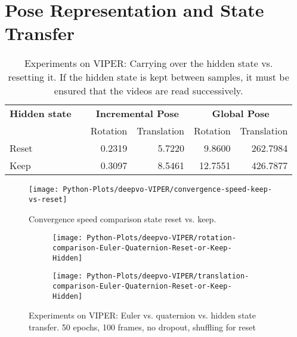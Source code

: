 	\section{Pose Representation and State Transfer}
		\begin{table}[tb]
			\small
			\begin{center}
				\begin{tabular}{lcrrrr}
					\toprule
					\textbf{Hidden state} & & \multicolumn{2}{c}{\textbf{Incremental Pose}} & \multicolumn{2}{c}{\textbf{Global Pose}} \\
					& & Rotation & Translation & Rotation & Translation \\
					\midrule
					Reset 		& 			& 0.2319	& 5.7220	& 9.8600	& 262.7984		\\ 
					Keep		&			& 0.3097	& 8.5461	& 12.7551	& 426.7877		\\
					\bottomrule
				\end{tabular}
			\end{center}
			\caption[Experiments on VIPER: Carrying over the hidden state vs. resetting it]
					{Experiments on VIPER: Carrying over the hidden state vs. resetting it.
					 If the hidden state is kept between samples, it must be ensured that the videos are read successively.
					 \label{tbl:kitti-removing-lstm}}
		\end{table}
	
		\begin{figure}[t]
			\centering
			\texttt{[image: Python-Plots/deepvo-VIPER/convergence-speed-keep-vs-reset]}
			\caption[]
					{Convergence speed comparison state reset vs. keep.}
		\end{figure}
		
		
		
		\begin{figure}
			\centering
			\begin{subfigure}[b]{0.5\linewidth}
				\centering
				\texttt{[image: Python-Plots/deepvo-VIPER/rotation-comparison-Euler-Quaternion-Reset-or-Keep-Hidden]}
				\caption{}
			\end{subfigure}%
			\begin{subfigure}[b]{0.5\linewidth}
				\centering
				\texttt{[image: Python-Plots/deepvo-VIPER/translation-comparison-Euler-Quaternion-Reset-or-Keep-Hidden]}
				\caption{}
			\end{subfigure}%
			\caption[Experiments on VIPER: Euler vs. quaternion vs. hidden state transfer]
					{Experiments on VIPER: Euler vs. quaternion vs. hidden state transfer.
			 50 epochs, 100 frames, no dropout, shuffling for reset
			 \label{fig:viper-euler-vs-quat-vs-hidden-state-keep-or-reset}}
		\end{figure}
		
